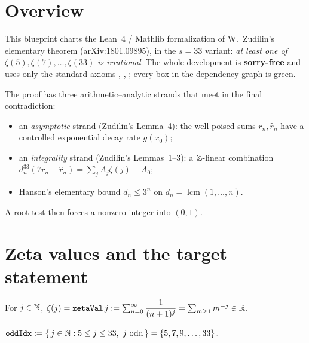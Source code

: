 
\chapter{Overview}

This blueprint charts the Lean~4 / Mathlib formalization of W.~Zudilin's
elementary theorem (arXiv:1801.09895), in the $s=33$ variant:
\emph{at least one of $\zeta(5),\zeta(7),\dots,\zeta(33)$ is irrational}.
The whole development is \textbf{sorry-free} and uses only the standard axioms
, , ; every box in the
dependency graph is green.

The proof has three arithmetic--analytic strands that meet in the final
contradiction:
\begin{itemize}
  \item an \emph{asymptotic} strand (Zudilin's Lemma~4): the well-poised sums
    $r_n,\hat r_n$ have a controlled exponential decay rate $g(x_0)$;
  \item an \emph{integrality} strand (Zudilin's Lemmas~1--3): a $\mathbb{Z}$-linear
    combination $d_n^{33}(7r_n-\hat r_n)=\sum_j A_j\zeta(j)+A_0$;
  \item Hanson's elementary bound $d_n\le 3^n$ on $d_n=\operatorname{lcm}(1,\dots,n)$.
\end{itemize}
A root test then forces a nonzero integer into $(0,1)$.

\chapter{Zeta values and the target statement}

\begin{definition}
  \label{def:zetaVal}
  \leanok
  For $j\in\mathbb{N}$, $\zeta(j)=\texttt{zetaVal}\,j:=\sum_{n=0}^{\infty}\dfrac{1}{(n+1)^{j}}
  =\sum_{m\ge1}m^{-j}\in\mathbb{R}$.
\end{definition}

\begin{definition}
  \label{def:oddIdx}
  \leanok
  $\code{oddIdx}:=\{\,j\in\N: 5\le j\le 33,\ j\ \text{odd}\,\}=\{5,7,9,\dots,33\}$.
\end{definition}

